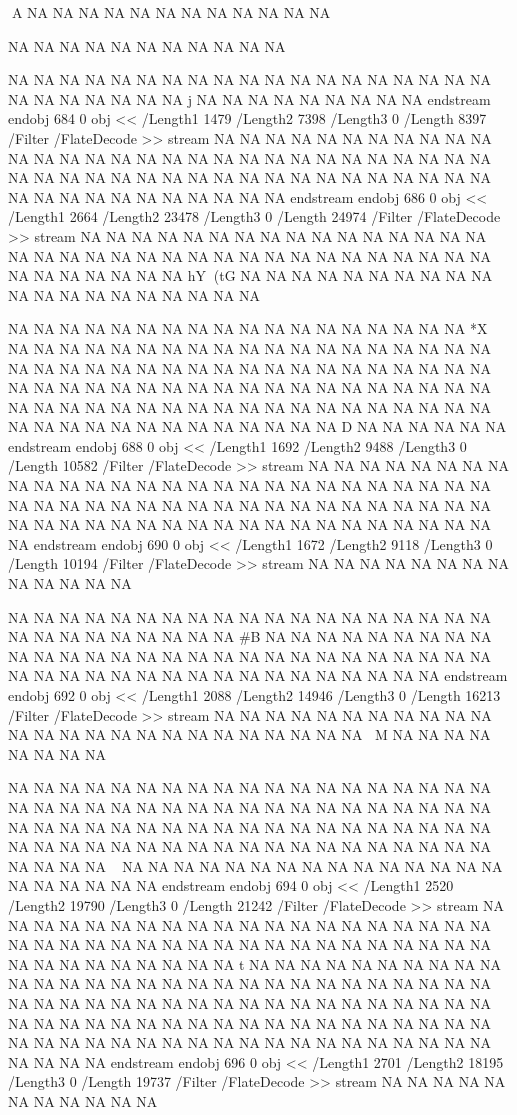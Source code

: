 {A
NA
NA
NA
NA
NA
NA
NA
NA
NA
NA
NA
NA

NA
NA
NA
NA
NA
NA
NA
NA
NA
NA
NA

NA
NA
NA
NA
NA
NA
NA
NA
NA
NA
NA
NA
NA
NA
NA
NA
NA
NA
NA
NA
NA
NA
NA
NA
NA
NA
j
NA
NA
NA
NA
NA
NA
NA
NA
NA
endstream
endobj
684 0 obj <<
/Length1 1479
/Length2 7398
/Length3 0
/Length 8397      
/Filter /FlateDecode
>>
stream
NA
NA
NA
NA
NA
NA
NA
NA
NA
NA
NA
NA
NA
NA
NA
NA
NA
NA
NA
NA
NA
NA
NA
NA
NA
NA
NA
NA
NA
NA
NA
NA
NA
NA
NA
NA
NA
NA
NA
NA
NA
NA
NA
NA
NA
NA
NA
NA
NA
NA
NA
NA
NA
NA
NA
NA
NA
NA
NA
NA
endstream
endobj
686 0 obj <<
/Length1 2664
/Length2 23478
/Length3 0
/Length 24974     
/Filter /FlateDecode
>>
stream
NA
NA
NA
NA
NA
NA
NA
NA
NA
NA
NA
NA
NA
NA
NA
NA
NA
NA
NA
NA
NA
NA
NA
NA
NA
NA
NA
NA
NA
NA
NA
NA
NA
NA
NA
NA
NA
NA
NA
NA
NA
NA
hY(tG
NA
NA
NA
NA
NA
NA
NA
NA
NA
NA
NA
NA
NA
NA
NA
NA
NA
NA
NA
NA

NA
NA
NA
NA
NA
NA
NA
NA
NA
NA
NA
NA
NA
NA
NA
NA
NA
NA
*X
NA
NA
NA
NA
NA
NA
NA
NA
NA
NA
NA
NA
NA
NA
NA
NA
NA
NA
NA
NA
NA
NA
NA
NA
NA
NA
NA
NA
NA
NA
NA
NA
NA
NA
NA
NA
NA
NA
NA
NA
NA
NA
NA
NA
NA
NA
NA
NA
NA
NA
NA
NA
NA
NA
NA
NA
NA
NA
NA
NA
NA
NA
NA
NA
NA
NA
NA
NA
NA
NA
NA
NA
NA
NA
NA
NA
NA
NA
NA
NA
NA
NA
NA
NA
NA
NA
NA
NA
NA
D
NA
NA
NA
NA
NA
NA
endstream
endobj
688 0 obj <<
/Length1 1692
/Length2 9488
/Length3 0
/Length 10582     
/Filter /FlateDecode
>>
stream
NA
NA
NA
NA
NA
NA
NA
NA
NA
NA
NA
NA
NA
NA
NA
NA
NA
NA
NA
NA
NA
NA
NA
NA
NA
NA
NA
NA
NA
NA
NA
NA
NA
NA
NA
NA
NA
NA
NA
NA
NA
NA
NA
NA
NA
NA
NA
NA
NA
NA
NA
NA
NA
NA
NA
NA
NA
NA
NA
NA
NA
NA
NA
NA
NA
NA
endstream
endobj
690 0 obj <<
/Length1 1672
/Length2 9118
/Length3 0
/Length 10194     
/Filter /FlateDecode
>>
stream
NA
NA
NA
NA
NA
NA
NA
NA
NA
NA
NA
NA
NA

NA
NA
NA
NA
NA
NA
NA
NA
NA
NA
NA
NA
NA
NA
NA
NA
NA
NA
NA
NA
NA
NA
NA
NA
NA
NA
NA
NA
#B
NA
NA
NA
NA
NA
NA
NA
NA
NA
NA
NA
NA
NA
NA
NA
NA
NA
NA
NA
NA
NA
NA
NA
NA
NA
NA
NA
NA
NA
NA
NA
NA
NA
NA
NA
NA
NA
NA
NA
NA
NA
NA
NA
NA
NA
endstream
endobj
692 0 obj <<
/Length1 2088
/Length2 14946
/Length3 0
/Length 16213     
/Filter /FlateDecode
>>
stream
NA
NA
NA
NA
NA
NA
NA
NA
NA
NA
NA
NA
NA
NA
NA
NA
NA
NA
NA
NA
NA
NA
NA
NA
NA
M
NA
NA
NA
NA
NA
NA
NA
NA

NA
NA
NA
NA
NA
NA
NA
NA
NA
NA
NA
NA
NA
NA
NA
NA
NA
NA
NA
NA
NA
NA
NA
NA
NA
NA
NA
NA
NA
NA
NA
NA
NA
NA
NA
NA
NA
NA
NA
NA
NA
NA
NA
NA
NA
NA
NA
NA
NA
NA
NA
NA
NA
NA
NA
NA
NA
NA
NA
NA
NA
NA
NA
NA
NA
NA
NA
NA
NA
NA
NA
NA
NA
NA
NA
NA
NA
NA
NA
NA
~
NA
NA
NA
NA
NA
NA
NA
NA
NA
NA
NA
NA
NA
NA
NA
NA
NA
NA
NA
NA
NA
endstream
endobj
694 0 obj <<
/Length1 2520
/Length2 19790
/Length3 0
/Length 21242     
/Filter /FlateDecode
>>
stream
NA
NA
NA
NA
NA
NA
NA
NA
NA
NA
NA
NA
NA
NA
NA
NA
NA
NA
NA
NA
NA
NA
NA
NA
NA
NA
NA
NA
NA
NA
NA
NA
NA
NA
NA
NA
NA
NA
NA
NA
NA
NA
NA
NA
NA
NA
NA
NA
t
NA
NA
NA
NA
NA
NA
NA
NA
NA
NA
NA
NA
NA
NA
NA
NA
NA
NA
NA
NA
NA
NA
NA
NA
NA
NA
NA
NA
NA
NA
NA
NA
NA
NA
NA
NA
NA
NA
NA
NA
NA
NA
NA
NA
NA
NA
NA
NA
NA
NA
NA
NA
NA
NA
NA
NA
NA
NA
NA
NA
NA
NA
NA
NA
NA
NA
NA
NA
NA
NA
NA
NA
NA
NA
NA
NA
NA
NA
NA
NA
NA
NA
NA
NA
NA
NA
NA
NA
NA
NA
endstream
endobj
696 0 obj <<
/Length1 2701
/Length2 18195
/Length3 0
/Length 19737     
/Filter /FlateDecode
>>
stream
NA
NA
NA
NA
NA
NA
NA
NA
NA
NA
NA

}

